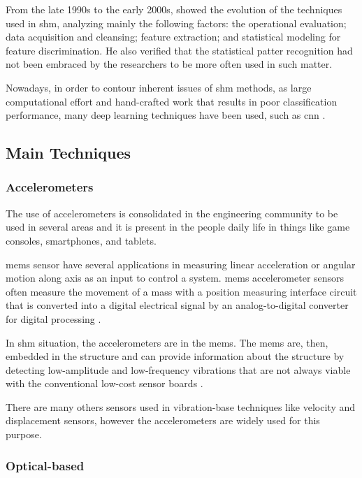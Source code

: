 From the late 1990s to the early 2000s, \citet{sohn2003} showed the evolution of the techniques used in \gls*{shm}, analyzing mainly the following factors: the operational evaluation; data acquisition and cleansing; feature extraction; and statistical modeling for feature discrimination. 
He also verified that the statistical patter recognition had not been embraced by the researchers to be more often used in such matter.

Nowadays, in order to contour inherent issues of \gls*{shm} methods, as large computational effort and hand-crafted work that results in poor classification performance, many deep learning techniques have been used, such as \gls*{cnn} \citep{avci2017}.

\subsection{Main Techniques}\label{sec:shm_main_techniques}

\subsubsection*{Accelerometers}

The use of accelerometers is consolidated in the engineering community to be used in several areas and it is present in the people daily life in things like game consoles, smartphones, and tablets.

\gls*{mems} sensor have several applications in measuring linear acceleration or angular motion along axis as an input to control a system.
\gls*{mems} accelerometer sensors often measure the movement of a mass with a position measuring interface circuit that is converted into a digital electrical signal by an analog-to-digital converter for digital processing \citep{dadafshar2014}.

In \gls*{shm} situation, the accelerometers are in the \gls*{mems}. The \gls*{mems} are, then, embedded in the structure and can provide information about the structure by detecting low-amplitude and low-frequency vibrations that are not always viable with the conventional low-cost sensor boards \citep{sabato2017}.

There are many others sensors used in vibration-base techniques like velocity and displacement sensors, however the accelerometers are widely used for this purpose.

\subsubsection*{Optical-based} 

